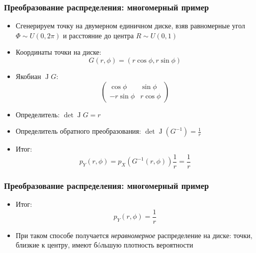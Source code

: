 \documentclass[10pt]{beamer}
\begin{document}
\begin{frame}[fragile]
\frametitle{Преобразование распределения: многомерный пример}
\begin{itemize}
\item Сгенерируем точку на двумерном единичном диске, взяв равномерные угол \begin{math}\Phi\sim U(0,2\pi)\end{math} и расстояние до центра \begin{math}R\sim U(0,1)\end{math}
\pause
\item Координаты точки на диске: \begin{equation*}G(r,\phi) = (r\cos\phi, r\sin\phi)\end{equation*}
\pause
\item Якобиан \begin{math}\operatorname J G\end{math}:
\begin{equation*}
\begin{pmatrix}
\cos\phi & \sin\phi \\
-r\sin\phi & r\cos\phi
\end{pmatrix}
\end{equation*}
\pause
\item Определитель: \begin{math}\det \operatorname J G = r\end{math}
\pause
\item Определитель обратного преобразования: \begin{math}\det \operatorname J(G^{-1}) = \frac{1}{r}\end{math}
\pause
\item Итог: \begin{equation*}p_Y(r,\phi) = p_X(G^{-1}(r, \phi)) \frac{1}{r} = \frac{1}{r}\end{equation*}
\end{itemize}
\end{frame}

\begin{frame}[fragile]
\frametitle{Преобразование распределения: многомерный пример}
\begin{itemize}
\item Итог: \begin{equation*}p_Y(r,\phi) = \frac{1}{r}\end{equation*}
\pause
\item При таком способе получается \textit{неравномерное} распределение на диске: точки, близкие к центру, имеют бóльшую плотность вероятности
\end{itemize}
\end{frame}
\end{document}
